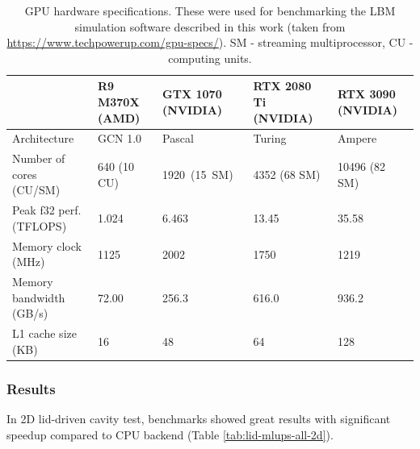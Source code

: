 \begin{table}[!ht]
	\centering\small
	{\renewcommand{\arraystretch}{1.1}%
		{\setlength{\tabcolsep}{0.4em}
			\begin{tabular}{ |p{4.3cm}||p{2.1cm}|p{2.2cm}|p{2.2cm}|p{2.5cm}| }
				\hline
				& R9 M370X \newline(AMD) & GTX 1070 \newline(NVIDIA) & RTX 2080 Ti \newline(NVIDIA) & RTX 3090 \newline(NVIDIA) \\
				\hline
				Architecture   & GCN 1.0 & Pascal  & Turing &  Ampere  \\
				\hline
				Number of cores (CU/SM)   & 640 (10 CU) & 1920~(15~SM)   &  4352 (68 SM) &  10496 (82 SM) \\
				\hline
				Peak f32 perf. (TFLOPS)   & 1.024  & 6.463  & 13.45 &  35.58 \\
				\hline
				Memory clock (MHz)   & 1125  & 2002   & 1750 &   1219 \\
				\hline
				Memory bandwidth (GB/s)   & 72.00  & 256.3   & 616.0 &   936.2 \\
				\hline
				L1 cache size (KB)   & 16  & 48   & 64 &   128 \\
				\hline
	\end{tabular}}}
	\caption{GPU hardware specifications. These were used for benchmarking the LBM simulation software described in this work (taken from \url{https://www.techpowerup.com/gpu-specs/}). SM - streaming multiprocessor, CU - computing units.}
	\label{tab:gpus}
\end{table}

\subsubsection{Results}

In 2D lid-driven cavity test, benchmarks showed great results with significant speedup compared to CPU backend (Table \ref{tab:lid-mlups-all-2d}).

